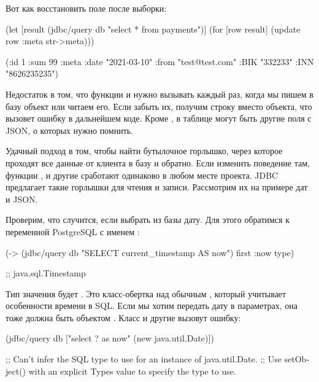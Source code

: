 Вот как восстановить поле  после выборки:

\begin{english}
  \begin{clojure}
(let [result
      (jdbc/query db "select * from payments")]
  (for [row result]
    (update row :meta str->meta)))

({:id 1
  :sum 99
  :meta {:date "2021-03-10"
         :from "test@test.com"
         :BIK "332233"
         :INN "8626235235"}})
  \end{clojure}
\end{english}

Недостаток в том, что функции  и  нужно вызывать каждый раз, когда мы пишем в базу объект или читаем его. Если забыть их, получим строку вместо объекта, что вызовет ошибку в дальнейшем коде. Кроме , в таблице могут быть другие поля с JSON, о которых нужно помнить.

Удачный подход в том, чтобы найти бутылочное горлышко, через которое проходят все данные от клиента в базу и обратно. Если изменить поведение там, функции ,  и другие сработают одинаково в любом месте проекта. JDBC предлагает такие горлышки для чтения и записи. Рассмотрим их на примере дат и JSON.

Проверим, что случится, если выбрать из базы дату. Для этого обратимся к переменной PostgreSQL с именем :

\begin{english}
  \begin{clojure}
(-> (jdbc/query db "SELECT current_timestamp AS now")
    first
    :now
    type)

;; java.sql.Timestamp
  \end{clojure}
\end{english}

Тип значения будет . Это класс-обертка над обычным , который учитывает особенности времени в SQL. Если мы хотим передать дату в параметрах, она тоже должна быть объектом . Класс  и другие вызовут ошибку:

\begin{english}
  \begin{clojure}
(jdbc/query db ["select ? as now" (new java.util.Date)])

;; Can't infer the SQL type to use for an instance of java.util.Date.
;; Use setObject() with an explicit Types value to specify the type to use.
  \end{clojure}
\end{english}

